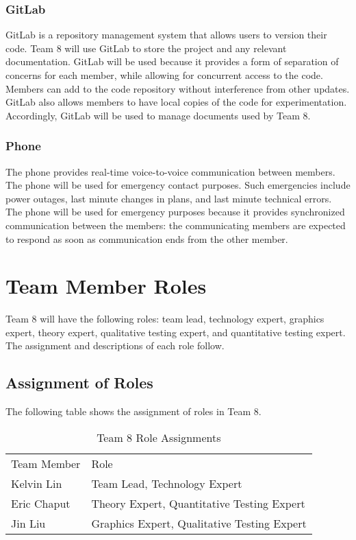 \documentclass{article}
\begin{document}
\subsubsection{GitLab}
GitLab is a repository management system that allows users to version their code. Team 8 will use GitLab to store the project and any relevant documentation. GitLab will be used because it provides a form of separation of concerns for each member, while allowing for concurrent access to the code. Members can add to the code repository without interference from other updates. GitLab also allows members to have local copies of the code for experimentation. Accordingly, GitLab will be used to manage documents used by Team 8.

\subsubsection{Phone}
The phone provides real-time voice-to-voice communication between members. The phone will be used for emergency contact purposes. Such emergencies include power outages, last minute changes in plans, and last minute technical errors. The phone will be used for emergency purposes because it provides synchronized communication between the members: the communicating members are expected to respond as soon as communication ends from the other member.

\section{Team Member Roles}
Team 8 will have the following roles: team lead, technology expert, graphics 
expert, theory expert, qualitative testing expert, and quantitative testing 
expert. The assignment and descriptions of each role follow.

\subsection{Assignment of Roles}
The following table shows the assignment of roles in Team 8.

\begin{table}[h!]
	\begin{tabular}{ll}
		Team Member & Role                                        \\
		Kelvin Lin  & Team Lead, Technology Expert                \\
		Eric Chaput & Theory Expert, Quantitative Testing Expert  \\
		Jin Liu     & Graphics Expert, Qualitative Testing Expert
	\end{tabular}

	\caption{Team 8 Role Assignments}
\end{table}
\end{document}
